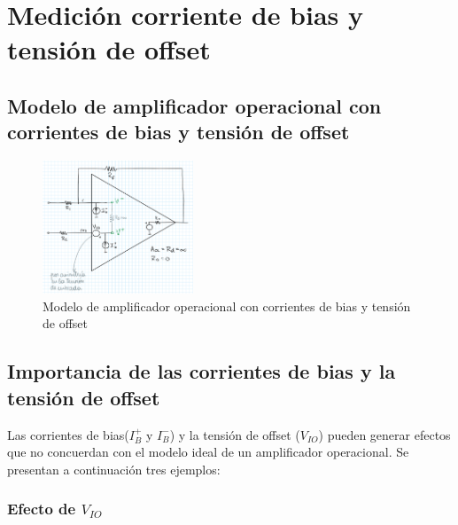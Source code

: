 \documentclass[../../main.tex]{subfiles}
\begin{document}
\section{Medici\'on corriente de bias y tensi\'on de offset}

\subsection{Modelo de amplificador operacional con corrientes de bias y tensi\'on de offset}

\begin{figure}[htb]	%
	\centering
	\includegraphics[width=0.4\textwidth]{imagenes/modelo_opamp_vio_ibias.png}
	\caption{Modelo de amplificador operacional con corrientes de bias y tensi\'on de offset}
	\label{fig:ej_3_modelo_opamp_vio_ibias}
\end{figure}












\subsection{Importancia de las corrientes de bias y la tensi\'on de offset}


Las corrientes de bias($I_B^+$ y $I_B^-$) y la tensi\'on de offset ($V_{IO}$) pueden generar efectos que no concuerdan con el modelo ideal de un amplificador operacional. Se presentan a continuaci\'on tres ejemplos:

\subsubsection*{Efecto de $V_{IO}$}
\end{document}
